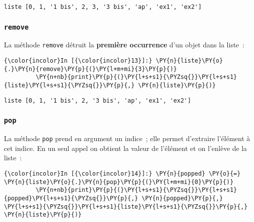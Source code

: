     \begin{Verbatim}[commandchars=\\\{\}]
liste [0, 1, '1 bis', 2, 3, '3 bis', 'ap', 'ex1', 'ex2']

    \end{Verbatim}

    \hypertarget{remove}{%
\subsubsection{\texorpdfstring{\texttt{remove}}{remove}}\label{remove}}

    La méthode \texttt{remove} détruit la \textbf{première occurrence} d'un
objet dans la liste~:

    \begin{Verbatim}[commandchars=\\\{\}]
{\color{incolor}In [{\color{incolor}13}]:} \PY{n}{liste}\PY{o}{.}\PY{n}{remove}\PY{p}{(}\PY{l+m+mi}{3}\PY{p}{)}
         \PY{n+nb}{print}\PY{p}{(}\PY{l+s+s1}{\PYZsq{}}\PY{l+s+s1}{liste}\PY{l+s+s1}{\PYZsq{}}\PY{p}{,} \PY{n}{liste}\PY{p}{)}
\end{Verbatim}


    \begin{Verbatim}[commandchars=\\\{\}]
liste [0, 1, '1 bis', 2, '3 bis', 'ap', 'ex1', 'ex2']

    \end{Verbatim}

    \hypertarget{pop}{%
\subsubsection{\texorpdfstring{\texttt{pop}}{pop}}\label{pop}}

    La méthode \texttt{pop} prend en argument un indice~; elle permet
d'extraire l'élément à cet indice. En un seul appel on obtient la valeur
de l'élément et on l'enlève de la liste~:

    \begin{Verbatim}[commandchars=\\\{\}]
{\color{incolor}In [{\color{incolor}14}]:} \PY{n}{popped} \PY{o}{=} \PY{n}{liste}\PY{o}{.}\PY{n}{pop}\PY{p}{(}\PY{l+m+mi}{0}\PY{p}{)}
         \PY{n+nb}{print}\PY{p}{(}\PY{l+s+s1}{\PYZsq{}}\PY{l+s+s1}{popped}\PY{l+s+s1}{\PYZsq{}}\PY{p}{,} \PY{n}{popped}\PY{p}{,} \PY{l+s+s1}{\PYZsq{}}\PY{l+s+s1}{liste}\PY{l+s+s1}{\PYZsq{}}\PY{p}{,} \PY{n}{liste}\PY{p}{)}
\end{Verbatim}



